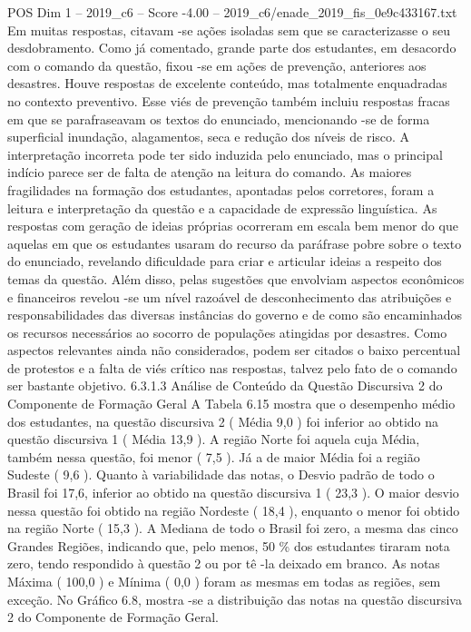 \begin{textsample}{POS Dim 1 – 2019\_c6 – Score -4.00 – 2019\_c6/enade\_2019\_fis\_0e9c433167.txt}
Em muitas respostas, citavam -se ações isoladas sem que se caracterizasse o seu desdobramento.
Como já comentado, grande parte dos estudantes, em desacordo com o comando da questão, fixou -se em ações de prevenção, anteriores aos desastres.
Houve respostas de excelente conteúdo, mas totalmente enquadradas no contexto preventivo.
Esse viés de prevenção também incluiu respostas fracas em que se parafraseavam os textos do enunciado, mencionando -se de forma superficial inundação, alagamentos, seca e redução dos níveis de risco.
A interpretação incorreta pode ter sido induzida pelo enunciado, mas o principal indício parece ser de falta de atenção na leitura do comando.
As maiores fragilidades na formação dos estudantes, apontadas pelos corretores, foram a leitura e interpretação da questão e a capacidade de expressão linguística.
As respostas com geração de ideias próprias ocorreram em escala bem menor do que aquelas em que os estudantes usaram do recurso da paráfrase pobre sobre o texto do enunciado, revelando dificuldade para criar e articular ideias a respeito dos temas da questão.
Além disso, pelas sugestões que envolviam aspectos econômicos e financeiros revelou -se um nível razoável de desconhecimento das atribuições e responsabilidades das diversas instâncias do governo e de como são encaminhados os recursos necessários ao socorro de populações atingidas por desastres.
Como aspectos relevantes ainda não considerados, podem ser citados o baixo percentual de protestos e a falta de viés crítico nas respostas, talvez pelo fato de o comando ser bastante objetivo. 6.3.1.3 Análise de Conteúdo da Questão Discursiva 2 do Componente de Formação Geral A Tabela 6.15 mostra que o desempenho médio dos estudantes, na questão discursiva 2 ( Média 9,0 ) foi inferior ao obtido na questão discursiva 1 ( Média 13,9 ).
A região Norte foi aquela cuja Média, também nessa questão, foi menor ( 7,5 ).
Já a de maior Média foi a região Sudeste ( 9,6 ).
Quanto à variabilidade das notas, o Desvio padrão de todo o Brasil foi 17,6, inferior ao obtido na questão discursiva 1 ( 23,3 ).
O maior desvio nessa questão foi obtido na região Nordeste ( 18,4 ), enquanto o menor foi obtido na região Norte ( 15,3 ).
A Mediana de todo o Brasil foi zero, a mesma das cinco Grandes Regiões, indicando que, pelo menos, 50 \% dos estudantes tiraram nota zero, tendo respondido à questão 2 ou por tê -la deixado em branco.
As notas Máxima ( 100,0 ) e Mínima ( 0,0 ) foram as mesmas em todas as regiões, sem exceção.
No Gráfico 6.8, mostra -se a distribuição das notas na questão discursiva 2 do Componente de Formação Geral.

\end{textsample}
